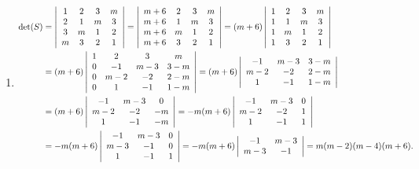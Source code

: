 {{\begin{enumerate}
\item  
\begin{align*}\ensuremath
\mbox{det}(S)&=\left|
\begin{array}{cccc}
1&2&3&m\\
2&1&m&3\\
3&m&1&2\\
m&3&2&1
\end{array}\right|=\left|
\begin{array}{cccc}
m+6&2&3&m\\
m+6&1&m&3\\
m+6&m&1&2\\
m+6&3&2&1
\end{array}\right|=(m+6)\left|
\begin{array}{cccc}
1&2&3&m\\
1&1&m&3\\
1&m&1&2\\
1&3&2&1
\end{array}\right|\\
 &=(m+6)\left|
\begin{array}{cccc}
1&2&3&m\\
0&-1&m-3&3-m\\
0&m-2&-2&2-m\\
0&1&-1&1-m
\end{array}\right|=(m+6)\left|
\begin{array}{ccc}
-1&m-3&3-m\\
m-2&-2&2-m\\
1&-1&1-m
\end{array}\right|\\
 &=(m+6)\left|
\begin{array}{ccc}
-1&m-3&0\\
m-2&-2&-m\\
1&-1&-m
\end{array}\right|=-m(m+6)\left|
\begin{array}{ccc}
-1&m-3&0\\
m-2&-2&1\\
1&-1&1
\end{array}\right|\\
 &=-m(m+6)\left|
\begin{array}{ccc}
-1&m-3&0\\
m-3&-1&0\\
1&-1&1
\end{array}\right|
=-m(m+6)\left|
\begin{array}{cc}
-1&m-3\\
m-3&-1
\end{array}\right|=m(m-2)(m-4)(m+6).
\end{align*}


\end{enumerate}}}

